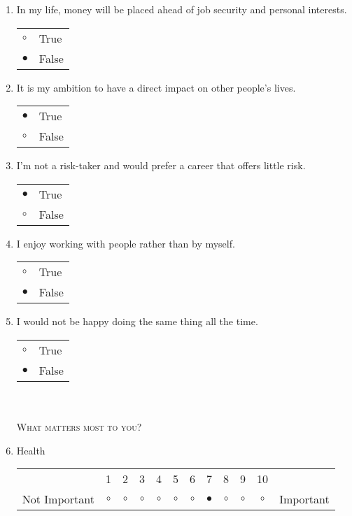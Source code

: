 \documentclass{article}
\begin{document}
\begin{enumerate}
\item In my life, money will be placed ahead of job security and personal interests. \\
\begin{tabular}{l l}
     $\circ$ & True\\
     $\bullet$ & False\\ 
\end{tabular}

\item It is my ambition to have a direct impact on other people’s lives.\\
\begin{tabular}{l l}
     $\bullet$ & True\\
     $\circ$ & False\\ 
\end{tabular}

\item I’m not a risk-taker and would prefer a career that offers little risk.\\
\begin{tabular}{l l}
     $\bullet$ & True\\
     $\circ$ & False\\ 
\end{tabular}

\item I enjoy working with people rather than by myself.\\
\begin{tabular}{l l}
     $\circ$ & True\\
     $\bullet$ & False\\ 
\end{tabular}

\item I would not be happy doing the same thing all the time. \\
\begin{tabular}{l l}
     $\circ$ & True\\
     $\bullet$ & False\\ 
\end{tabular}\\\\


\textsc{What matters most to you?}\\

\item Health\\
\vspace{5pt}
\begin{tabular}{c c c c c c c c c c c c}
     & 1 & 2 & 3 & 4 & 5 & 6 & 7 & 8 & 9 & 10 & \\
    Not Important & $\circ$ & $\circ$ & $\circ$ & $\circ$ & $\circ$ & $\circ$ & $\bullet$ & $\circ$ & $\circ$ & $\circ$ & Important \\ 
\end{tabular}


\end{enumerate}
\end{document}
